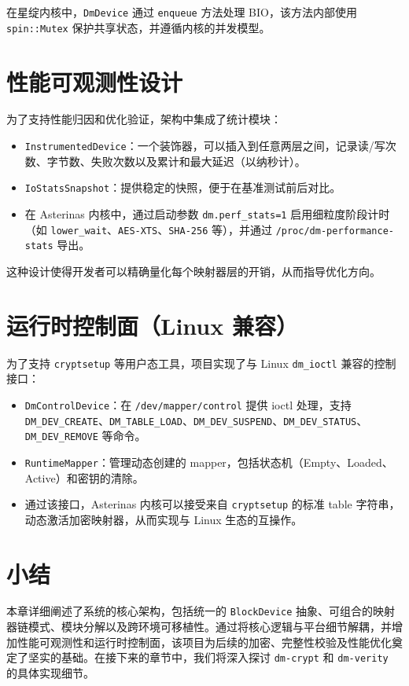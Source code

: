 在星绽内核中，\texttt{DmDevice} 通过 \texttt{enqueue} 方法处理 BIO，该方法内部使用 \texttt{spin::\allowbreak Mutex} 保护共享状态，并遵循内核的并发模型。

\section{性能可观测性设计}

为了支持性能归因和优化验证，架构中集成了统计模块：

\begin{itemize}
    \item \texttt{Instrumented\allowbreak Device}：一个装饰器，可以插入到任意两层之间，记录读/写次数、字节数、失败次数以及累计和最大延迟（以纳秒计）。
    \item \texttt{IoStats\allowbreak Snapshot}：提供稳定的快照，便于在基准测试前后对比。
    \item 在 Asterinas 内核中，通过启动参数 \texttt{dm.perf\_\allowbreak stats=1} 启用细粒度阶段计时（如 \texttt{lower\_\allowbreak wait}、\texttt{AES-XTS}、\texttt{SHA-256} 等），并通过 \texttt{/proc/\allowbreak dm-\allowbreak performance-\allowbreak stats} 导出。
\end{itemize}

这种设计使得开发者可以精确量化每个映射器层的开销，从而指导优化方向。

\section{运行时控制面（Linux 兼容）}

为了支持 \texttt{cryptsetup} 等用户态工具，项目实现了与 Linux \texttt{dm\_\allowbreak ioctl} 兼容的控制接口：

\begin{itemize}
    \item \texttt{DmControl\allowbreak Device}：在 \texttt{/dev/\allowbreak mapper/\allowbreak control} 提供 ioctl 处理，支持 \texttt{DM\_\allowbreak DEV\_\allowbreak CREATE}、\texttt{DM\_\allowbreak TABLE\_\allowbreak LOAD}、\texttt{DM\_\allowbreak DEV\_\allowbreak SUSPEND}、\texttt{DM\_\allowbreak DEV\_\allowbreak STATUS}、\texttt{DM\_\allowbreak DEV\_\allowbreak REMOVE} 等命令。
    \item \texttt{Runtime\allowbreak Mapper}：管理动态创建的 mapper，包括状态机（Empty、Loaded、Active）和密钥的清除。
    \item 通过该接口，Asterinas 内核可以接受来自 \texttt{cryptsetup} 的标准 table 字符串，动态激活加密映射器，从而实现与 Linux 生态的互操作。
\end{itemize}

\section{小结}

本章详细阐述了系统的核心架构，包括统一的 \texttt{BlockDevice} 抽象、可组合的映射器链模式、模块分解以及跨环境可移植性。通过将核心逻辑与平台细节解耦，并增加性能可观测性和运行时控制面，该项目为后续的加密、完整性校验及性能优化奠定了坚实的基础。在接下来的章节中，我们将深入探讨 \texttt{dm-crypt} 和 \texttt{dm-verity} 的具体实现细节。